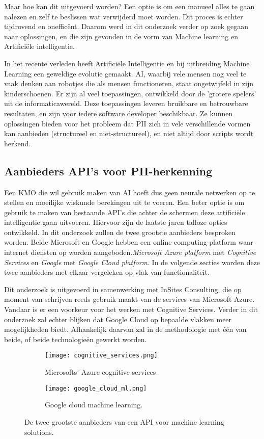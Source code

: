  Maar hoe kan dit uitgevoerd worden? Een optie is om een manueel alles te gaan nalezen en zelf te beslissen wat verwijderd moet worden. Dit proces is echter tijdrovend en onefficënt. Daarom werd in dit onderzoek verder op zoek gegaan naar oplossingen, en die zijn gevonden in de vorm van Machine learning en Artificiële intelligentie.


In het recente verleden heeft Artificiële Intelligentie en bij uitbreiding Machine Learning een geweldige evolutie gemaakt. AI, waarbij vele mensen nog veel te vaak denken aan robotjes die als mensen functioneren, staat ongetwijfeld in zijn kinderschoenen. Er zijn al veel toepassingen, ontwikkeld door de 'grotere spelers' uit de informaticawereld. Deze toepassingen leveren bruikbare en betrouwbare resultaten, en zijn voor iedere software developer beschikbaar. Ze kunnen oplossingen bieden voor het probleem dat PII zich in vele verschillende vormen kan aanbieden (structureel en niet-structureel), en niet altijd door scripts wordt herkend.  

\subsection{Aanbieders API's voor PII-herkenning}
Een KMO die wil gebruik maken van AI hoeft dus geen neurale netwerken op te stellen en moeilijke wiskunde berekingen uit te voeren. Een beter optie is om gebruik te maken van bestaande API's die achter de schermen deze artificiële intelligentie gaan uitvoeren. Hiervoor zijn de laatste jaren talloze opties ontwikkeld. In dit onderzoek zullen de twee grootste aanbieders besproken worden. Beide Microsoft en Google hebben een online computing-platform waar internet diensten op worden aangeboden.\textit{Microsoft Azure platform} met \textit{Cognitive Services} en  \textit{Google} met \textit{Google Cloud platform}. In de volgende secties worden deze twee aanbieders met elkaar vergeleken op vlak van functionaliteit.

Dit onderzoek is uitgevoerd in samenwerking met InSites Consulting, die op moment van schrijven reeds gebruik maakt van de services van Microsoft Azure. Vandaar is er een voorkeur voor het werken met Cognitive Services. Verder in dit onderzoek zal echter blijken dat Google Cloud op bepaalde vlakken meer mogelijkheden biedt. Afhankelijk daarvan zal in de methodologie met één van beide, of beide technologieën gewerkt worden. 

\begin{figure}[h]
	\centering
	\begin{subfigure}{0.5\textwidth}
		\centering
		\texttt{[image: cognitive\_services.png]}
		\caption{Microsofts' Azure cognitive services}
		\label{fig:sub11}
	\end{subfigure}%
	\begin{subfigure}{0.5\textwidth}
		\centering
		\texttt{[image: google\_cloud\_ml.png]}
		\caption{Google cloud machine learning.}
		\label{fig:sub22}
	\end{subfigure}
	\caption{De twee grootste aanbieders van een API voor machine learning solutions.}
	\label{fig:test2}
\end{figure}

